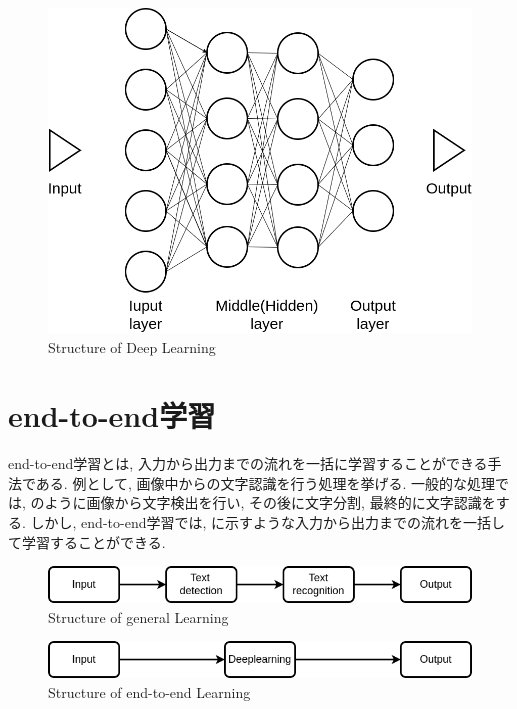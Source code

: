 \begin{figure}[h]
     \centering
     \includegraphics[keepaspectratio, scale=0.35]
     {images/dl.png}
     \caption{Structure of Deep Learning}
     \label{Fig:dl}
     \end{figure}

\newpage
\section{end-to-end学習}
end-to-end学習とは, 入力から出力までの流れを一括に学習することができる手法である. 例として, 画像中からの文字認識を行う処理を挙げる. 一般的な処理では, のように画像から文字検出を行い, その後に文字分割, 最終的に文字認識をする. しかし, end-to-end学習では, に示すような入力から出力までの流れを一括して学習することができる. 

\vspace{35mm}

\begin{figure}[h]
     \centering
     \includegraphics[keepaspectratio, scale=0.5]
     {images/example.png}
     \caption{Structure of general Learning}
     \label{Fig:example}
     \end{figure}

\begin{figure}[h]
     \centering
     \includegraphics[keepaspectratio, scale=0.5]
     {images/end-to-end.png}
     \caption{Structure of end-to-end Learning}
     \label{Fig:end-to-end}
     \end{figure}

